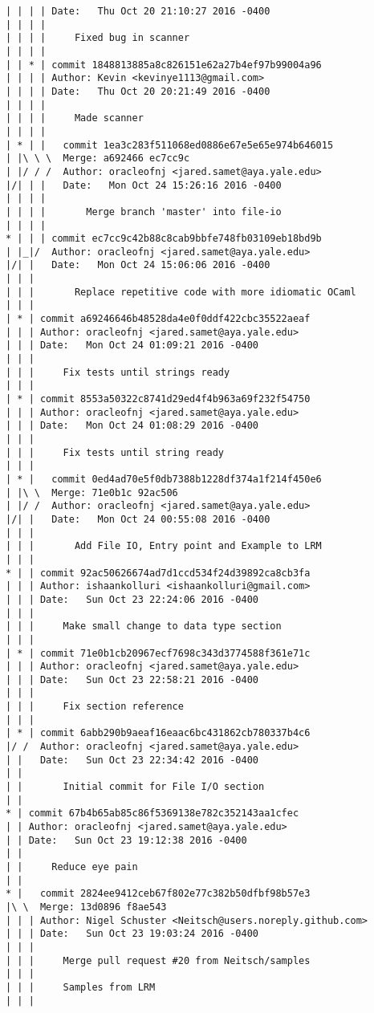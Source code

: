\begin{lstlisting}
| | | | Date:   Thu Oct 20 21:10:27 2016 -0400
| | | | 
| | | |     Fixed bug in scanner
| | | |     
| | * | commit 1848813885a8c826151e62a27b4ef97b99004a96
| | | | Author: Kevin <kevinye1113@gmail.com>
| | | | Date:   Thu Oct 20 20:21:49 2016 -0400
| | | | 
| | | |     Made scanner
| | | |       
| * | |   commit 1ea3c283f511068ed0886e67e5e65e974b646015
| |\ \ \  Merge: a692466 ec7cc9c
| |/ / /  Author: oracleofnj <jared.samet@aya.yale.edu>
|/| | |   Date:   Mon Oct 24 15:26:16 2016 -0400
| | | |   
| | | |       Merge branch 'master' into file-io
| | | |     
* | | | commit ec7cc9c42b88c8cab9bbfe748fb03109eb18bd9b
| |_|/  Author: oracleofnj <jared.samet@aya.yale.edu>
|/| |   Date:   Mon Oct 24 15:06:06 2016 -0400
| | |   
| | |       Replace repetitive code with more idiomatic OCaml
| | |    
| * | commit a69246646b48528da4e0f0ddf422cbc35522aeaf
| | | Author: oracleofnj <jared.samet@aya.yale.edu>
| | | Date:   Mon Oct 24 01:09:21 2016 -0400
| | | 
| | |     Fix tests until strings ready
| | |    
| * | commit 8553a50322c8741d29ed4f4b963a69f232f54750
| | | Author: oracleofnj <jared.samet@aya.yale.edu>
| | | Date:   Mon Oct 24 01:08:29 2016 -0400
| | | 
| | |     Fix tests until string ready
| | |      
| * |   commit 0ed4ad70e5f0db7388b1228df374a1f214f450e6
| |\ \  Merge: 71e0b1c 92ac506
| |/ /  Author: oracleofnj <jared.samet@aya.yale.edu>
|/| |   Date:   Mon Oct 24 00:55:08 2016 -0400
| | |   
| | |       Add File IO, Entry point and Example to LRM
| | |    
* | | commit 92ac50626674ad7d1ccd534f24d39892ca8cb3fa
| | | Author: ishaankolluri <ishaankolluri@gmail.com>
| | | Date:   Sun Oct 23 22:24:06 2016 -0400
| | | 
| | |     Make small change to data type section
| | |    
| * | commit 71e0b1cb20967ecf7698c343d3774588f361e71c
| | | Author: oracleofnj <jared.samet@aya.yale.edu>
| | | Date:   Sun Oct 23 22:58:21 2016 -0400
| | | 
| | |     Fix section reference
| | |    
| * | commit 6abb290b9aeaf16eaac6bc431862cb780337b4c6
|/ /  Author: oracleofnj <jared.samet@aya.yale.edu>
| |   Date:   Sun Oct 23 22:34:42 2016 -0400
| |   
| |       Initial commit for File I/O section
| |   
* | commit 67b4b65ab85c86f5369138e782c352143aa1cfec
| | Author: oracleofnj <jared.samet@aya.yale.edu>
| | Date:   Sun Oct 23 19:12:38 2016 -0400
| | 
| |     Reduce eye pain
| |     
* |   commit 2824ee9412ceb67f802e77c382b50dfbf98b57e3
|\ \  Merge: 13d0896 f8ae543
| | | Author: Nigel Schuster <Neitsch@users.noreply.github.com>
| | | Date:   Sun Oct 23 19:03:24 2016 -0400
| | | 
| | |     Merge pull request #20 from Neitsch/samples
| | |     
| | |     Samples from LRM
| | |      

\end{lstlisting}
